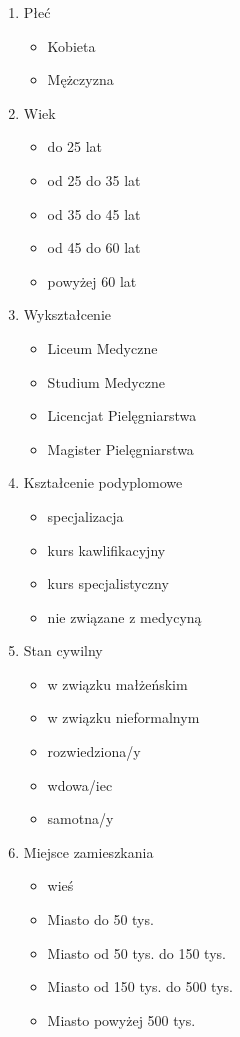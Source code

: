 \documentclass[a4paper,12pt,twoside,openright]{mwrep}
\begin{document}
\begin{appendices}
\begin{enumerate}[label=(\Roman*)]
	\item{Płeć}
		\begin{itemize}
			\item{Kobieta}
			\item{Mężczyzna}
		\end{itemize}
			\vspace{\baselineskip} 
	\item{Wiek}
		\begin{itemize}
			\item{do 25 lat}
			\item{od 25 do 35 lat}
			\item{od 35 do 45 lat}
			\item{od 45 do 60 lat}
			\item{powyżej 60 lat}
		\end{itemize}
			\vspace{\baselineskip} 
	\item{Wykształcenie}
		\begin{itemize}
			\item{Liceum Medyczne}
			\item{Studium Medyczne}
			\item{Licencjat Pielęgniarstwa}
			\item{Magister Pielęgniarstwa}
		\end{itemize}
			\vspace{\baselineskip} 
	\item{Kształcenie podyplomowe}
		\begin{itemize}
			\item{specjalizacja}
			\item{kurs kawlifikacyjny}
			\item{kurs specjalistyczny}
			\item{nie związane z medycyną}
		\end{itemize}
			\vspace{\baselineskip} 
	\item{Stan cywilny}
		\begin{itemize}
			\item{w związku małżeńskim}
			\item{w związku nieformalnym}
			\item{rozwiedziona/y}
			\item{wdowa/iec}
			\item{samotna/y}
		\end{itemize}
			\vspace{\baselineskip} 
	\item{Miejsce zamieszkania}
		\begin{itemize}
			\item{wieś}
			\item{Miasto do 50 tys.}
			\item{Miasto od 50 tys. do 150 tys.}
			\item{Miasto od 150 tys. do 500 tys.}
			\item{Miasto powyżej 500 tys.}
		\end{itemize}
			\vspace{\baselineskip} 


\end{enumerate}
\end{appendices}
\end{document}
